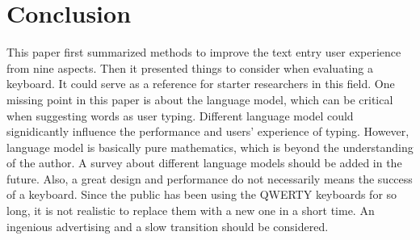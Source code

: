 \documentclass[11pt]{article}
\begin{document}
\section{Conclusion}\label{section-improvement}
This paper first summarized methods to improve the text entry user experience from nine aspects. Then it presented things to consider when evaluating a keyboard. It could serve as a reference for starter researchers in this field. One missing point in this paper is about the language model, which can be critical when suggesting words as user typing. Different language model could signidicantly influence the performance and users' experience of typing. However, language model is basically pure mathematics, which is beyond the understanding of the author. A survey about different language models should be added in the future. Also, a great design and performance do not necessarily means the success of a keyboard. Since the public has been using the QWERTY keyboards for so long, it is not realistic to replace them with a new one in a short time. An ingenious advertising and a slow transition should be considered.\\



\end{document}
